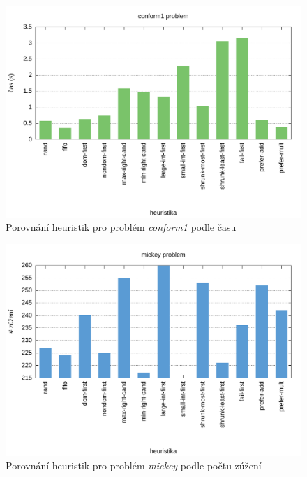 {\begin{figure}[H]
\centering
\includegraphics[scale=0.68]{chart/conform1_time.pdf}
\caption{Porovnání heuristik pro problém \emph{conform1} podle času}
\end{figure}

\begin{figure}[H]
\centering
\includegraphics[scale=0.68]{chart/mickey_nar.pdf}
\caption{Porovnání heuristik pro problém \emph{mickey} podle počtu zúžení}
\end{figure}

}
